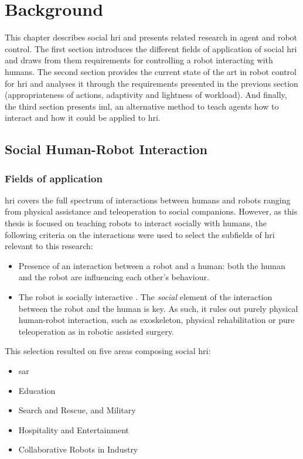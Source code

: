 \chapter{Background} \label{chap:background}
\glsresetall

This chapter describes social \gls{hri} and presents related research in agent and robot control. The first section introduces the different fields of application of social \gls{hri} and draws from them requirements for controlling a robot interacting with humans. The second section provides the current state of the art in robot control for \gls{hri} and analyses it through the requirements presented in the previous section (appropriateness of actions, adaptivity and lightness of workload). And finally, the third section presents \gls{iml}, an alternative method to teach agents how to interact and how it could be applied to \gls{hri}.

\section{Social Human-Robot Interaction}

\subsection{Fields of application}

\gls{hri} covers the full spectrum of interactions between humans and robots ranging from physical assistance and teleoperation to social companions. However, as this thesis is focused on teaching robots to interact socially with humans, the following criteria on the interactions were used to select the subfields of \gls{hri} relevant to this research:
\begin{itemize}
\item Presence of an interaction between a robot and a human: both the human and the robot are influencing each other's behaviour.
\item The robot is socially interactive \citep{Fong2003}. The \emph{social} element of the interaction between the robot and the human is  key. As such, it rules out purely physical human-robot interaction, such as exoskeleton, physical rehabilitation or pure teleoperation as in robotic assisted surgery.
\end{itemize}

This selection resulted on five areas composing social \gls{hri}: 
\begin{itemize}
	\item \acrfull{sar}
	\item Education
	\item Search and Rescue, and Military
	\item Hospitality and Entertainment
	\item Collaborative Robots in Industry
\end{itemize}

